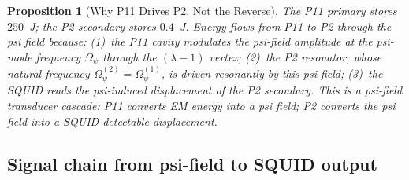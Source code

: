 \documentclass[11pt,twocolumn]{article}
\newcommand{\lam}{\lambda}
\newcommand{\Opsi}{\Omega_\psi}
\newtheorem{proposition}[theorem]{Proposition}
\theoremstyle{definition}
\theoremstyle{remark}
\begin{document}
\begin{proposition}[Why P11 Drives P2, Not the Reverse]
The P11 primary stores $250$~J; the P2 secondary stores $0.4$~J.
Energy flows from P11 to P2 through the psi field because:
(1)~the P11 cavity modulates the psi-field amplitude at the psi-mode
frequency $\Opsi$ through the $(\lam-1)$ vertex;
(2)~the P2 resonator, whose natural frequency $\Opsi^{(2)} = \Opsi^{(1)}$,
is driven resonantly by this psi field;
(3)~the SQUID reads the psi-induced displacement of the P2 secondary.
This is a \emph{psi-field transducer cascade}: P11 converts EM energy
into a psi field; P2 converts the psi field into a SQUID-detectable
displacement.
\end{proposition}

\subsection{Signal chain from psi-field to SQUID output}
\label{sec:signal_chain}
\end{document}
